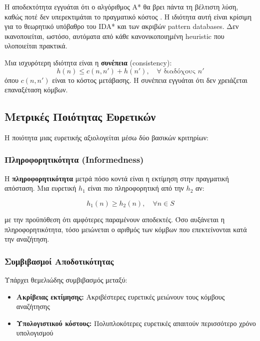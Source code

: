Η αποδεκτότητα εγγυάται ότι ο αλγόριθμος A* θα βρει πάντα τη βέλτιστη λύση,
καθώς ποτέ δεν υπερεκτιμάται το πραγματικό κόστος
\cite{pearl1984heuristics}. Η ιδιότητα αυτή είναι κρίσιμη για το θεωρητικό
υπόβαθρο του IDA* και των ακριβών pattern databases. Δεν ικανοποιείται,
ωστόσο, αυτόματα από κάθε κανονικοποιημένη heuristic που υλοποιείται
πρακτικά.

Μια ισχυρότερη ιδιότητα είναι η \textbf{συνέπεια} (consistency):
\begin{equation}
h(n) \leq c(n, n') + h(n'), \quad \forall \text{ διαδόχους } n'
\end{equation}
όπου $c(n, n')$ είναι το κόστος μετάβασης. Η συνέπεια εγγυάται ότι δεν χρειάζεται επαναξέταση κόμβων.

\subsection{Μετρικές Ποιότητας Ευρετικών}
\label{subsec:heuristic-quality}

Η ποιότητα μιας ευρετικής αξιολογείται μέσω δύο βασικών κριτηρίων:

\subsubsection{Πληροφορητικότητα (Informedness)}

Η \textbf{πληροφορητικότητα} μετρά πόσο κοντά είναι η εκτίμηση στην πραγματική απόσταση. Μια ευρετική $h_1$ είναι πιο πληροφορητική από την $h_2$ αν:

\begin{equation}
\label{eq:informedness}
h_1(n) \geq h_2(n), \quad \forall n \in S
\end{equation}

\noindent με την προϋπόθεση ότι αμφότερες παραμένουν αποδεκτές. Όσο αυξάνεται η πληροφορητικότητα, τόσο μειώνεται ο αριθμός των κόμβων που επεκτείνονται κατά την αναζήτηση.

\subsubsection{Συμβιβασμοί Αποδοτικότητας}

Υπάρχει θεμελιώδης συμβιβασμός μεταξύ:

\begin{itemize}
    \item \textbf{Ακρίβειας εκτίμησης:} Ακριβέστερες ευρετικές μειώνουν τους κόμβους αναζήτησης
    \item \textbf{Υπολογιστικού κόστους:} Πολυπλοκότερες ευρετικές απαιτούν περισσότερο χρόνο υπολογισμού
\end{itemize}

